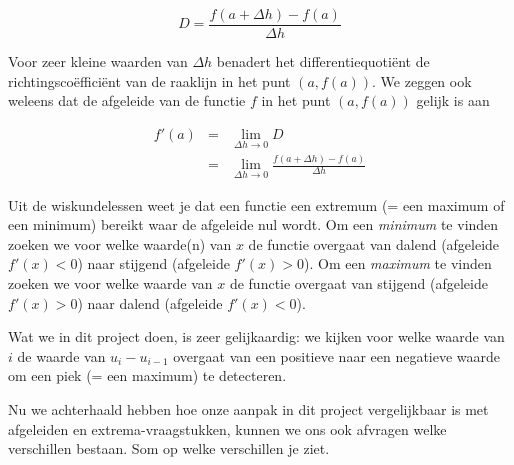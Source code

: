 \begin{equation}
D = \frac{f(a+\Delta h) - f(a)}{\Delta h}
\end{equation}

Voor zeer kleine waarden van $\Delta h$ benadert het differentiequoti\"ent de richtingsco\"effici\"ent van de raaklijn in het punt $(a,f(a))$. We zeggen ook weleens dat de afgeleide van de functie $f$ in het punt $(a,f(a))$ gelijk is aan 

\begin{eqnarray*}
f'(a) &=& \lim\limits_{\Delta h \to 0} D \\
&=& \lim\limits_{\Delta h \to 0} \frac{f(a+\Delta h)-f(a)}{\Delta h}
\end{eqnarray*}

Uit de wiskundelessen weet je dat een functie een extremum (= een maximum of een minimum) bereikt waar de afgeleide nul wordt. Om een \emph{minimum} te vinden zoeken we voor welke waarde(n) van $x$ de functie overgaat van dalend (afgeleide $f'(x)< 0$) naar stijgend (afgeleide $f'(x)> 0$). Om een \emph{maximum} te vinden zoeken we voor welke waarde van $x$ de functie overgaat van stijgend (afgeleide $f'(x)>0$) naar dalend (afgeleide $f'(x)<0$).

Wat we in dit project doen, is zeer gelijkaardig: we kijken voor welke waarde van $i$ de waarde van $u_{i}-u_{i-1}$ overgaat van een positieve naar een negatieve waarde om een piek (= een maximum) te detecteren. 

\begin{oef}
	Nu we achterhaald hebben hoe onze aanpak in dit project vergelijkbaar is met afgeleiden en extrema-vraagstukken, kunnen we ons ook afvragen welke verschillen bestaan. Som op welke verschillen je ziet.
\end{oef}

